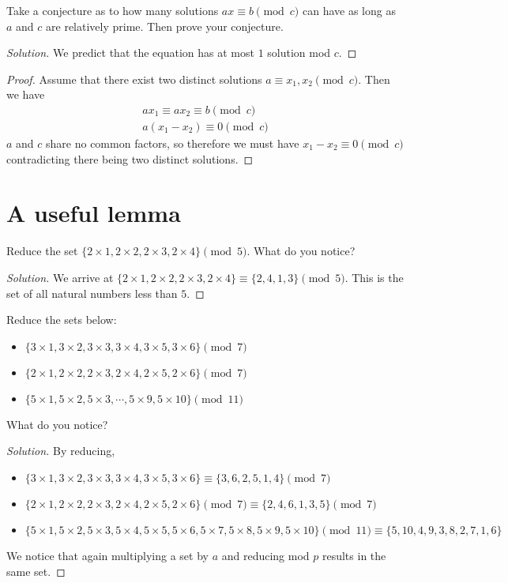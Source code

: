 \documentclass[12pt,openany]{book}
\theoremstyle{definition}
\newenvironment{soln}{\begin{proof}[Solution]}{\end{proof}}
\theoremstyle{definition}
\begin{document}
\begin{exmp}  Take a conjecture as to how many solutions $ax\equiv b\pmod{c}$ can have as long as $a$ and $c$ are relatively prime.  Then prove your conjecture. \end{exmp}

\begin{soln}  We predict that the equation has at most $1$ solution mod $c$. \end{soln}
\begin{proof}  Assume that there exist two distinct solutions $a\equiv x_1, x_2\pmod{c}$.  Then we have \begin{eqnarray*} ax_1\equiv ax_2\equiv b\pmod{c} \\ a(x_1-x_2)\equiv 0\pmod{c} \end{eqnarray*}
$a$ and $c$ share no common factors, so therefore we must have $x_1-x_2\equiv 0\pmod{c}$ contradicting there being two distinct solutions.  \end{proof} 

\section{A useful lemma}
\begin{exmp}  Reduce the set $\{2\times 1, 2\times 2, 2\times 3, 2\times 4\}\pmod{5}$.  What do you notice?  \end{exmp}

\begin{soln}  We arrive at $\{2\times 1, 2\times 2, 2\times 3, 2\times 4\}\equiv \{2, 4, 1, 3\}\pmod{5}$.  This is the set of all natural numbers less than $5$.  \end{soln}

\begin{exmp}  Reduce the sets below:
\begin{itemize}
\item $\{3\times 1, 3\times 2, 3\times 3, 3\times 4, 3\times 5, 3\times 6\}\pmod{7}$
\item $\{2\times 1, 2\times 2, 2\times 3, 2\times 4, 2\times 5, 2\times 6\}\pmod{7}$
\item $\{5\times 1, 5\times 2, 5\times 3, \cdots, 5\times 9, 5\times 10\}\pmod{11}$
\end{itemize}  What do you notice? \end{exmp}

\begin{soln} By reducing, \begin{itemize}
\item  $\{3\times 1, 3\times 2, 3\times 3, 3\times 4, 3\times 5, 3\times 6\}\equiv \{3, 6, 2, 5, 1, 4\}\pmod{7}$
\item  $\{2\times 1, 2\times 2, 2\times 3, 2\times 4, 2\times 5, 2\times 6\}\pmod{7}\equiv \{2, 4, 6, 1, 3, 5\}\pmod{7}$
\item $\{5\times 1, 5\times 2, 5\times 3, 5\times 4, 5\times 5, 5\times 6, 5\times 7, 5\times 8, 5\times 9, 5\times 10\}\pmod{11}\equiv \{5, 10, 4, 9, 3, 8, 2, 7, 1,  6\}$
\end{itemize}
We notice that again multiplying a set by $a$ and reducing mod $p$ results in the same set.  \end{soln}
\end{document}
